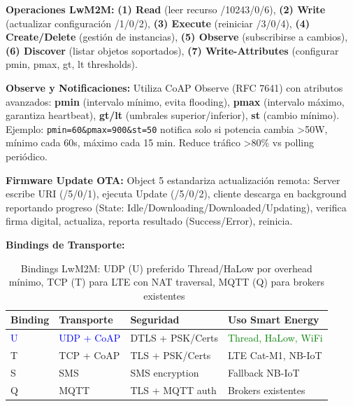 \textbf{Operaciones LwM2M:} \textbf{(1) Read} (leer recurso /10243/0/6), \textbf{(2) Write} (actualizar configuración /1/0/2), \textbf{(3) Execute} (reiniciar /3/0/4), \textbf{(4) Create/Delete} (gestión de instancias), \textbf{(5) Observe} (subscribirse a cambios), \textbf{(6) Discover} (listar objetos soportados), \textbf{(7) Write-Attributes} (configurar pmin, pmax, gt, lt thresholds).

\textbf{Observe y Notificaciones:} Utiliza CoAP Observe (RFC 7641) con atributos avanzados: \textbf{pmin} (intervalo mínimo, evita flooding), \textbf{pmax} (intervalo máximo, garantiza heartbeat), \textbf{gt/lt} (umbrales superior/inferior), \textbf{st} (cambio mínimo). Ejemplo: \texttt{pmin=60\&pmax=900\&st=50} notifica solo si potencia cambia >50W, mínimo cada 60s, máximo cada 15 min. Reduce tráfico >80\% vs polling periódico.

\textbf{Firmware Update OTA:} Object 5 estandariza actualización remota: Server escribe URI (/5/0/1), ejecuta Update (/5/0/2), cliente descarga en background reportando progreso (State: Idle/Downloading/Downloaded/Updating), verifica firma digital, actualiza, reporta resultado (Success/Error), reinicia.

\textbf{Bindings de Transporte:}

\begin{table}[h]
\small
\centering
\caption{Bindings LwM2M: UDP (U) preferido Thread/HaLow por overhead mínimo, TCP (T) para LTE con NAT traversal, MQTT (Q) para brokers existentes~\cite{bartoliAllianceSDNMQTT2025}}
\label{tab:lwm2m-bindings}
\begin{tabular}{p{1.5cm}p{3.5cm}p{3.8cm}p{3cm}}
\hline
\rowcolor{gray!20}
\textbf{Binding} & \textbf{Transporte} & \textbf{Seguridad} & \textbf{Uso Smart Energy} \\
\hline
\textcolor{blue}{U} & \textcolor{blue}{UDP + CoAP} & DTLS + PSK/Certs & \textcolor{green}{Thread, HaLow, WiFi} \\
\hline
T & TCP + CoAP & TLS + PSK/Certs & LTE Cat-M1, NB-IoT \\
\hline
S & SMS & SMS encryption & Fallback NB-IoT \\
\hline
Q & MQTT & TLS + MQTT auth & Brokers existentes \\
\hline
\end{tabular}
\end{table}

